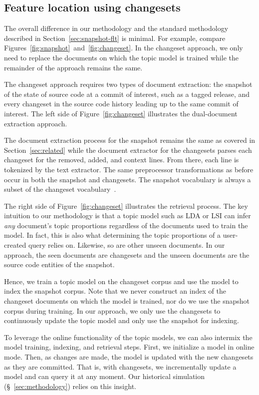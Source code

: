 \subsection{Feature location using changesets}

The overall difference in our methodology and the standard methodology described
in Section~\ref{sec:snapshot-flt} is minimal. For example, compare
Figures~\ref{fig:snapshot}~and~\ref{fig:changeset}. In the changeset approach,
we only need to replace the documents on which the topic model is trained while
the remainder of the approach remains the same.

The changeset approach requires two types of document extraction: the snapshot
of the state of source code at a commit of interest, such as a tagged release,
and every changeset in the source code history leading up to the same commit of
interest. The left side of Figure~\ref{fig:changeset} illustrates the
dual-document extraction approach.

The document extraction process for the snapshot remains the same as covered in
Section~\ref{sec:related} while the document extractor for the changesets parses
each changeset for the removed, added, and context lines. From there, each line
is tokenized by the text extractor. The same preprocessor transformations as
before occur in both the snapshot and changesets. The snapshot vocabulary is
always a subset of the changeset vocabulary~\cite{Corley-etal_2014}.

The right side of Figure~\ref{fig:changeset} illustrates the retrieval process.
The key intuition to our methodology is that a topic model such as LDA or LSI
can infer \emph{any} document's topic proportions regardless of the documents
used to train the model. In fact, this is also what determining the topic
proportions of a user-created query relies on. Likewise, so are other unseen
documents. In our approach, the seen documents are changesets and the unseen
documents are the source code entities of the snapshot.

Hence, we train a topic model on the changeset corpus and use the model to index
the snapshot corpus. Note that we never construct an index of the changeset
documents on which the model is trained, nor do we use the snapshot corpus
during training. In our approach, we only use the changesets to continuously
update the topic model and only use the snapshot for indexing.

To leverage the online functionality of the topic models, we can also intermix
the model training, indexing, and retrieval steps. First, we initialize a model
in online mode. Then, as changes are made, the model is updated with the new
changesets as they are committed. That is, with changesets, we incrementally
update a model and can query it at any moment. Our historical simulation
(\S~\ref{sec:methodology}) relies on this insight.

